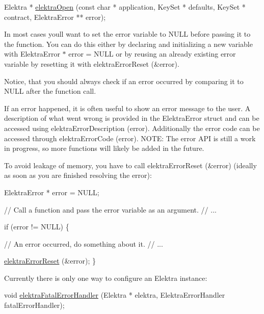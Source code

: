 \begin{DoxyCode}
Elektra * \hyperlink{group__highlevel_ga45de58b05c7a8ab02f6c54ddd31a56e1}{elektraOpen} (\textcolor{keyword}{const} \textcolor{keywordtype}{char} * application, KeySet * defaults, KeySet * contract, 
      ElektraError ** error);
\end{DoxyCode}


In most cases you\textquotesingle{}ll want to set the error variable to {\ttfamily N\+U\+LL} before passing it to the function. You can do this either by declaring and initializing a new variable with {\ttfamily Elektra\+Error $\ast$ error = N\+U\+LL} or by reusing an already existing error variable by resetting it with {\ttfamily elektra\+Error\+Reset (\&error)}.

Notice, that you should always check if an error occurred by comparing it to {\ttfamily N\+U\+LL} after the function call.

If an error happened, it is often useful to show an error message to the user. A description of what went wrong is provided in the {\ttfamily Elektra\+Error} struct and can be accessed using {\ttfamily elektra\+Error\+Description (error)}. Additionally the error code can be accessed through {\ttfamily elektra\+Error\+Code (error)}. N\+O\+TE\+: The error A\+PI is still a work in progress, so more functions will likely be added in the future.

To avoid leakage of memory, you have to call {\ttfamily elektra\+Error\+Reset (\&error)} (ideally as soon as you are finished resolving the error)\+:


\begin{DoxyCode}
ElektraError * error = NULL;

\textcolor{comment}{// Call a function and pass the error variable as an argument.}
\textcolor{comment}{// ...}

\textcolor{keywordflow}{if} (error != NULL)
\{

  \textcolor{comment}{// An error occurred, do something about it.}
  \textcolor{comment}{// ...}

  \hyperlink{group__highlevel_ga591f7ed4b57a341928bf7bb3d7adb693}{elektraErrorReset} (&error);
\}
\end{DoxyCode}


Currently there is only one way to configure an {\ttfamily Elektra} instance\+:


\begin{DoxyCode}
\textcolor{keywordtype}{void} \hyperlink{group__highlevel_ga496441e9e1dd80ed14a239dfc4c08c40}{elektraFatalErrorHandler} (Elektra * elektra, ElektraErrorHandler 
      fatalErrorHandler);
\end{DoxyCode}


